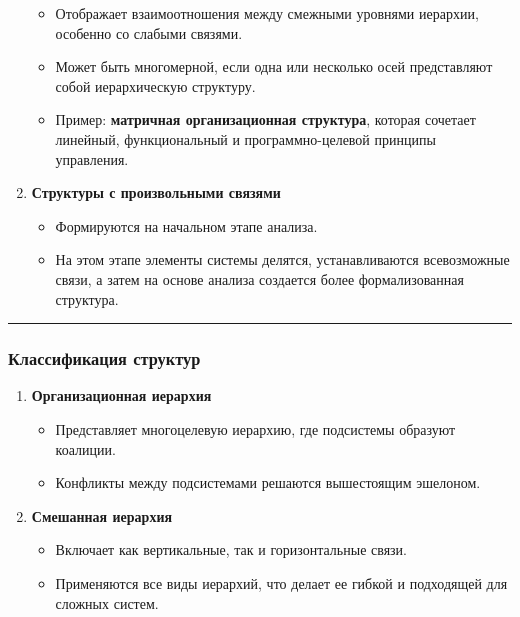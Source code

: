 \documentclass[
]{article}
\providecommand{\tightlist}{%
  \setlength{\itemsep}{0pt}\setlength{\parskip}{0pt}}
\begin{document}
\begin{enumerate}
  \begin{itemize}
  \tightlist
  \item
    Отображает взаимоотношения между смежными уровнями иерархии,
    особенно со слабыми связями.
  \item
    Может быть многомерной, если одна или несколько осей представляют
    собой иерархическую структуру.
  \item
    Пример: \textbf{матричная организационная структура}, которая
    сочетает линейный, функциональный и программно-целевой принципы
    управления.
  \end{itemize}
\item
  \textbf{Структуры с произвольными связями}

  \begin{itemize}
  \tightlist
  \item
    Формируются на начальном этапе анализа.
  \item
    На этом этапе элементы системы делятся, устанавливаются всевозможные
    связи, а затем на основе анализа создается более формализованная
    структура.
  \end{itemize}
\end{enumerate}

\begin{center}\rule{0.5\linewidth}{0.5pt}\end{center}

\subsubsection{\texorpdfstring{\textbf{Классификация
структур}}{Классификация структур}}\label{ux43aux43bux430ux441ux441ux438ux444ux438ux43aux430ux446ux438ux44f-ux441ux442ux440ux443ux43aux442ux443ux440}

\begin{enumerate}
\def\labelenumi{\arabic{enumi}.}
\item
  \textbf{Организационная иерархия}

  \begin{itemize}
  \tightlist
  \item
    Представляет многоцелевую иерархию, где подсистемы образуют
    коалиции.
  \item
    Конфликты между подсистемами решаются вышестоящим эшелоном.
  \end{itemize}
\item
  \textbf{Смешанная иерархия}

  \begin{itemize}
  \tightlist
  \item
    Включает как вертикальные, так и горизонтальные связи.
  \item
    Применяются все виды иерархий, что делает ее гибкой и подходящей для
    сложных систем.
  \end{itemize}
\end{enumerate}
\end{document}
